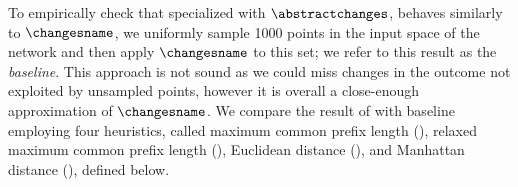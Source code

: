 

To empirically check that \impatto{} specialized with $\abstractchanges$, behaves similarly to $\changesname$, we uniformly sample 1000 points in the input space of the network and then apply $\changesname$ to this set; we refer to this result as the \textit{baseline}.
This approach is not sound as we could miss changes in the outcome not exploited by unsampled points, however it is overall a close-enough approximation of $\changesname$.
%
We compare the result of \impatto{} with baseline employing four heuristics, called maximum common prefix length (\mcpl), relaxed maximum common prefix length (\rmcpl), Euclidean distance (\euclidean), and Manhattan distance (\manhattan), defined below.

